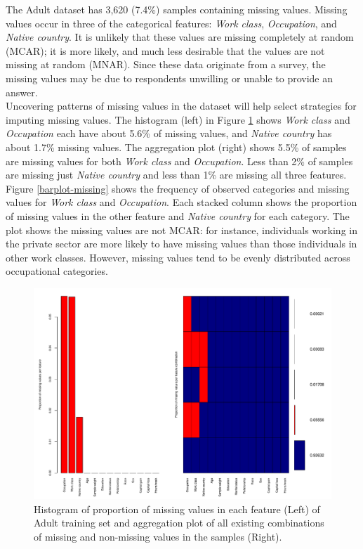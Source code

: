 \documentclass[12pt]{article}
\begin{document}
The Adult dataset has 3,620 (7.4\%) samples containing missing values. Missing values occur in three of the categorical features: \textit{Work class}, \textit{Occupation}, and \textit{Native country}. It is unlikely that these values are missing completely at random (MCAR); it is more likely, and much less desirable that the values are not missing at random (MNAR). Since these data originate from a survey, the missing values may be due to respondents unwilling or unable to provide an answer.  \\

Uncovering patterns of missing values in the dataset will help select strategies for imputing missing values. The histogram (left) in Figure \ref{proportion-missing} shows \textit{Work class} and \textit{Occupation} each have about 5.6\% of missing values, and \textit{Native country} has about 1.7\% missing values. The aggregation plot (right) shows 5.5\% of samples are missing values for both \textit{Work class} and \textit{Occupation}. Less than 2\% of samples are missing just \textit{Native country} and less than 1\% are missing all three features.\\

Figure \ref{barplot-missing} shows the frequency of observed categories and missing values for \textit{Work class} and \textit{Occupation}. Each stacked column shows the proportion of missing values in the other feature and \textit{Native country} for each category. The plot shows the missing values are not MCAR: for instance, individuals working in the private sector are more likely to have missing values than those individuals in other work classes. However, missing values tend to be evenly distributed across occupational categories. 

\begin{figure}[htbp] 
   \centering
   \includegraphics[scale=.6]{proportion-missing.pdf} 
   \caption{Histogram of proportion of missing values in each feature (Left) of Adult training set and aggregation plot of all existing combinations of missing and non-missing values in the samples (Right).}
   \label{proportion-missing}
\end{figure}
\end{document}
